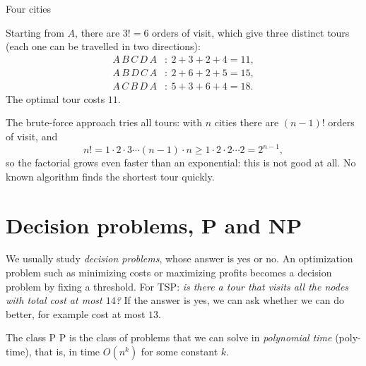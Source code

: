 \documentclass[a4paper,12pt,oneside]{report}
\begin{document}
\begin{framedexample}{Four cities}\label{ex:tsp-four}
\begin{center}
\end{center}
Starting from $A$, there are $3!=6$ orders of visit, which give three
distinct tours (each one can be travelled in two directions):
\begin{align*}
  A\,B\,C\,D\,A&:\ 2+3+2+4=11,\\
  A\,B\,D\,C\,A&:\ 2+6+2+5=15,\\
  A\,C\,B\,D\,A&:\ 5+3+6+4=18.
\end{align*}
The optimal tour costs $11$.
\end{framedexample}

The brute-force approach tries all tours:
with $n$ cities there are $(n-1)!$ orders of visit, and
\[
  n!=1\cdot2\cdot3\cdots(n-1)\cdot n\geq1\cdot2\cdot2\cdots2=2^{n-1},
\]
so the factorial grows even faster than an exponential: this is not
good at all. No known algorithm finds the shortest tour quickly.

\section{Decision problems, P and NP}

We usually study \emph{decision problems}, whose answer is yes or no.
An optimization problem such as minimizing costs or maximizing profits
becomes a decision problem by fixing a threshold. For TSP: \emph{is
there a tour that visits all the nodes with total cost at most $14$?}
If the answer is yes, we can ask whether we can do better, for example
cost at most $13$.

\begin{frameddefn}{The class P}\label{def:class-p}
$\mathrm{P}$ is the class of problems that we can solve in
\emph{polynomial time} (poly-time), that is, in time $O(n^k)$ for some
constant $k$.
\end{frameddefn}
\end{document}
